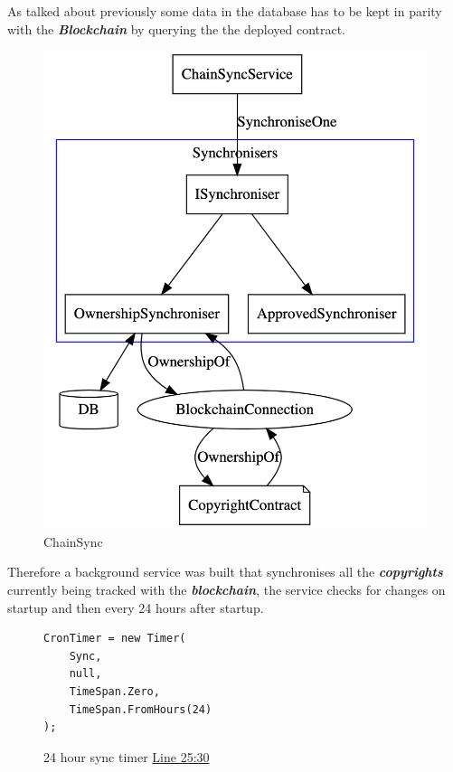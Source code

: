 \documentclass[12pt]{article}
\newcommand{\keyword}[1]{\textbf{\textit{#1}}}
\newcommand{\br}[0]{\\~\\}
\begin{document}
\br

As talked about previously some data in the database has to be kept in parity with the \keyword{Blockchain} by querying the the deployed contract.

\begin{figure}[H]
\caption{ChainSync}
\centering
\includegraphics[width=\textwidth,height=0.5\textheight,keepaspectratio]{images/operational/chain-sync}
\end{figure}

Therefore a background service was built that synchronises all the \keyword{copyrights} currently being tracked with the \keyword{blockchain}, the service checks for changes on startup and then every 24 hours after startup.

\begin{figure}[H]
\caption{24 hour sync timer \href{https://github.com/MrHarrisonBarker/CRPL/blob/main/CRPL.Web/Core/ChainSync/ChainSyncService.cs}{Line 25:30}}
\centering
\begin{lstlisting}[language=CSharp]
CronTimer = new Timer(
	Sync,
	null,
	TimeSpan.Zero,
	TimeSpan.FromHours(24)
);
\end{lstlisting}
\end{figure}
\end{document}
